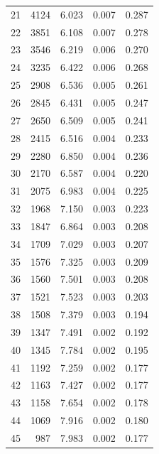 \begin{table}
\begin{tabular}{rrrrr}
  21 &   4124 &          6.023 &        0.007 &           0.287 \\
  22 &   3851 &          6.108 &        0.007 &           0.278 \\
  23 &   3546 &          6.219 &        0.006 &           0.270 \\
  24 &   3235 &          6.422 &        0.006 &           0.268 \\
  25 &   2908 &          6.536 &        0.005 &           0.261 \\
  26 &   2845 &          6.431 &        0.005 &           0.247 \\
  27 &   2650 &          6.509 &        0.005 &           0.241 \\
  28 &   2415 &          6.516 &        0.004 &           0.233 \\
  29 &   2280 &          6.850 &        0.004 &           0.236 \\
  30 &   2170 &          6.587 &        0.004 &           0.220 \\
  31 &   2075 &          6.983 &        0.004 &           0.225 \\
  32 &   1968 &          7.150 &        0.003 &           0.223 \\
  33 &   1847 &          6.864 &        0.003 &           0.208 \\
  34 &   1709 &          7.029 &        0.003 &           0.207 \\
  35 &   1576 &          7.325 &        0.003 &           0.209 \\
  36 &   1560 &          7.501 &        0.003 &           0.208 \\
  37 &   1521 &          7.523 &        0.003 &           0.203 \\
  38 &   1508 &          7.379 &        0.003 &           0.194 \\
  39 &   1347 &          7.491 &        0.002 &           0.192 \\
  40 &   1345 &          7.784 &        0.002 &           0.195 \\
  41 &   1192 &          7.259 &        0.002 &           0.177 \\
  42 &   1163 &          7.427 &        0.002 &           0.177 \\
  43 &   1158 &          7.654 &        0.002 &           0.178 \\
  44 &   1069 &          7.916 &        0.002 &           0.180 \\
  45 &    987 &          7.983 &        0.002 &           0.177 \\

\end{tabular}
\end{table}
